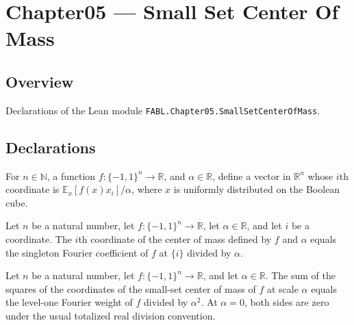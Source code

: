 \chapter{Chapter05 — Small Set Center Of Mass}
\section{Overview}

Declarations of the Lean module \texttt{FABL.Chapter05.SmallSetCenterOfMass}.

\section{Declarations}

\begin{definition}
\label{FABL.smallSetCenterOfMass}
\leanok
{}
For $n\in\mathbb N$, a function $f:\{-1,1\}^n\to\mathbb R$, and $\alpha\in\mathbb R$,
define a vector in $\mathbb R^n$ whose $i$th coordinate is $\mathbb
E_x[f(x)x_i]/\alpha$, where $x$ is uniformly distributed on the Boolean cube.
\end{definition}

\begin{theorem}
\label{FABL.smallSetCenterOfMass_apply}
\leanok
{}
Let $n$ be a natural number, let $f:\{-1,1\}^n\to\mathbb{R}$, let $\alpha\in\mathbb{R}$,
and let $i$ be a coordinate. The $i$th coordinate of the center of mass defined by $f$
and $\alpha$ equals the singleton Fourier coefficient of $f$ at $\{i\}$ divided by
$\alpha$.
\end{theorem}

\begin{theorem}
\label{FABL.sum_sq_smallSetCenterOfMass}
\leanok
{}
Let $n$ be a natural number, let $f:\{-1,1\}^n\to\mathbb R$, and let $\alpha\in\mathbb
R$. The sum of the squares of the coordinates of the small-set center of mass of $f$ at
scale $\alpha$ equals the level-one Fourier weight of $f$ divided by $\alpha^2$. At
$\alpha=0$, both sides are zero under the usual totalized real division convention.
\end{theorem}

